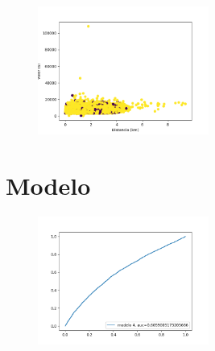 \documentclass[10pt,a4paper]{article}
\begin{document}
		\begin{figure}[h]
			\centering
			\includegraphics[width=0.5\textwidth]{../Img/Figure_5}
		\end{figure}
	\section{Modelo}	
		\begin{figure}[h]
			\centering
			\includegraphics[width=0.5\textwidth]{../Img/curvaRocModelo4 }
		\end{figure}
\end{document}

